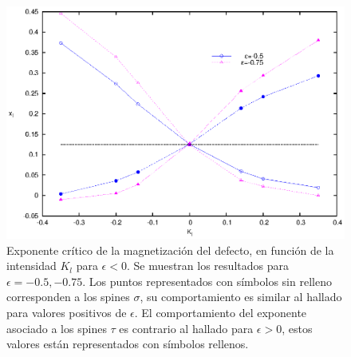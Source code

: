 \begin{figure}[h!]
\begin{center}
\includegraphics[width=\figwidth]{graf/exp/exp_all_neg_01.eps}
\end{center}
\caption{Exponente crítico de la magnetización del defecto, en función de la intensidad $K_{l}$ para $\epsilon <0$. Se muestran los resultados
 para $\epsilon=-0.5,-0.75$. Los puntos representados con símbolos sin relleno corresponden a los spines $\sigma$, su comportamiento es similar
 al hallado para valores positivos de $\epsilon$. El comportamiento del exponente asociado a los spines $\tau$ es contrario al hallado para
 $\epsilon>0$, estos valores están representados con símbolos rellenos.}
\label{fig:exp_neg_e0.75}
\end{figure}
